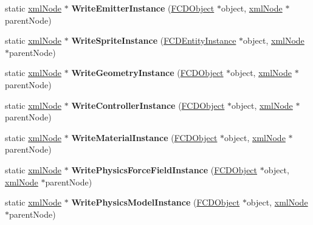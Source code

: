 \begin{DoxyCompactItemize}
\item 
\hypertarget{classFArchiveXML_ac11151ce93b520019166830033e7989d}{
static \hyperlink{struct__xmlNode}{xmlNode} $\ast$ {\bfseries WriteEmitterInstance} (\hyperlink{classFCDObject}{FCDObject} $\ast$object, \hyperlink{struct__xmlNode}{xmlNode} $\ast$parentNode)}
\label{classFArchiveXML_ac11151ce93b520019166830033e7989d}

\item 
\hypertarget{classFArchiveXML_a10f7dde0be8257ff5a05d9ab57f56d89}{
static \hyperlink{struct__xmlNode}{xmlNode} $\ast$ {\bfseries WriteSpriteInstance} (\hyperlink{classFCDEntityInstance}{FCDEntityInstance} $\ast$object, \hyperlink{struct__xmlNode}{xmlNode} $\ast$parentNode)}
\label{classFArchiveXML_a10f7dde0be8257ff5a05d9ab57f56d89}

\item 
\hypertarget{classFArchiveXML_aa7b0355376dd9371b9e737799c5d928e}{
static \hyperlink{struct__xmlNode}{xmlNode} $\ast$ {\bfseries WriteGeometryInstance} (\hyperlink{classFCDObject}{FCDObject} $\ast$object, \hyperlink{struct__xmlNode}{xmlNode} $\ast$parentNode)}
\label{classFArchiveXML_aa7b0355376dd9371b9e737799c5d928e}

\item 
\hypertarget{classFArchiveXML_ac08fda654194cba9b0ae862bc8250639}{
static \hyperlink{struct__xmlNode}{xmlNode} $\ast$ {\bfseries WriteControllerInstance} (\hyperlink{classFCDObject}{FCDObject} $\ast$object, \hyperlink{struct__xmlNode}{xmlNode} $\ast$parentNode)}
\label{classFArchiveXML_ac08fda654194cba9b0ae862bc8250639}

\item 
\hypertarget{classFArchiveXML_a4daabc243b617a14c153eb156f6ddf87}{
static \hyperlink{struct__xmlNode}{xmlNode} $\ast$ {\bfseries WriteMaterialInstance} (\hyperlink{classFCDObject}{FCDObject} $\ast$object, \hyperlink{struct__xmlNode}{xmlNode} $\ast$parentNode)}
\label{classFArchiveXML_a4daabc243b617a14c153eb156f6ddf87}

\item 
\hypertarget{classFArchiveXML_a5855343a9b949652a2724fe7cf875f79}{
static \hyperlink{struct__xmlNode}{xmlNode} $\ast$ {\bfseries WritePhysicsForceFieldInstance} (\hyperlink{classFCDObject}{FCDObject} $\ast$object, \hyperlink{struct__xmlNode}{xmlNode} $\ast$parentNode)}
\label{classFArchiveXML_a5855343a9b949652a2724fe7cf875f79}

\item 
\hypertarget{classFArchiveXML_a59df97ff9d45ab17e6da0901a994291b}{
static \hyperlink{struct__xmlNode}{xmlNode} $\ast$ {\bfseries WritePhysicsModelInstance} (\hyperlink{classFCDObject}{FCDObject} $\ast$object, \hyperlink{struct__xmlNode}{xmlNode} $\ast$parentNode)}
\label{classFArchiveXML_a59df97ff9d45ab17e6da0901a994291b}


\end{DoxyCompactItemize}
